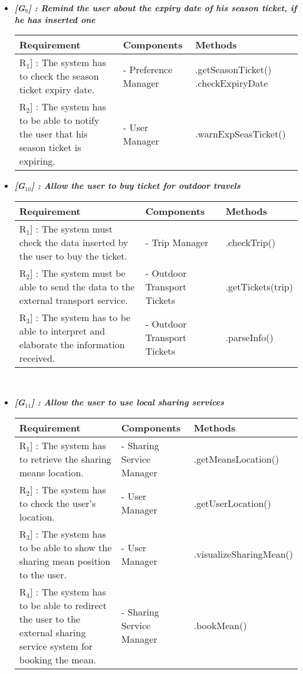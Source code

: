 \begin{itemize}
	\item \emph{\textbf{[G$_{9}$] : Remind the user about the expiry date of his season ticket, if he has inserted one}}
	\vspace{0.4cm}\\
	\begin{tabular}[H]{p{5cm}|p{4cm}|p{4cm}}
		\textbf{Requirement} & \textbf{Components} & \textbf{Methods}\\
		\hline
		\rule{0pt}{4ex}\lbrack R$_{1}$] : The system has to check the season ticket expiry date. & - Preference Manager & .getSeasonTicket() .checkExpiryDate\\
		\hline
		\rule{0pt}{4ex}\lbrack R$_{2}$] : The system has to be able to notify the user that his season ticket is expiring. & - User Manager & .warnExpSeasTicket()
	\end{tabular}
	
	\newpage
	\item \emph{\textbf{[G$_{10}$] : Allow the user to buy ticket for outdoor travels}}
	\vspace{0.4cm}\\
	\begin{tabular}[H]{p{5cm}|p{4cm}|p{4cm}}
		\textbf{Requirement} & \textbf{Components} & \textbf{Methods}\\
		\hline
		\rule{0pt}{4ex}\lbrack R$_{1}$] : The system must check the data inserted by the user to buy the ticket. & - Trip Manager & .checkTrip()\\
		\hline
		\rule{0pt}{4ex}\lbrack R$_{2}$] : The system must be able to send the data to the external transport service. & - Outdoor Transport Tickets & .getTickets(trip)\\
		\hline
		\rule{0pt}{4ex}\lbrack R$_{3}$] : The system has to be able to interpret and elaborate the information received. & - Outdoor Transport Tickets & .parseInfo()
	\end{tabular}
	\vspace{0.3cm}\\
	
	\item \emph{\textbf{[G$_{11}$] : Allow the user to use local sharing services}}
	\vspace{0.4cm}\\
	\begin{tabular}[H]{p{5cm}|p{4cm}|p{4cm}}
		\textbf{Requirement} & \textbf{Components} & \textbf{Methods}\\
		\hline
		\rule{0pt}{4ex}\lbrack R$_{1}$] : The system has to retrieve the sharing means location. & - Sharing Service Manager & .getMeansLocation()\\
		\hline
		\rule{0pt}{4ex}\lbrack R$_{2}$] : The system has to check the user's location. & - User Manager & .getUserLocation()\\
		\hline
		\rule{0pt}{4ex}\lbrack R$_{3}$] : The system has to be able to show the sharing mean position to the user. & - User Manager & .visualizeSharingMean()\\
		\hline
		\rule{0pt}{4ex}\lbrack R$_{4}$] : The system has to be able to redirect the user to the external sharing service system for booking the mean. & - Sharing Service Manager & .bookMean()
	\end{tabular}
	

\end{itemize}
